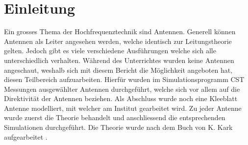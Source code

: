 \section{Einleitung}

Ein grosses Thema der Hochfrequenztechnik sind Antennen. Generell können Antennen als Leiter angesehen werden, welche identisch zur Leitungstheorie gelten. Jedoch gibt es viele verschiedene Ausführungen welche sich alle unterschiedlich verhalten. Während des Unterrichtes wurden keine Antennen angeschaut, weshalb sich mit diesem Bericht die Möglichkeit angeboten hat, diesen Teilbereich aufzuarbeiten. Hierfür wurden im Simulationsprogramm CST Messungen ausgewählter Antennen durchgeführt, welche sich vor allem auf die Direktivität der Antennen beziehen. Als Abschluss wurde noch eine Kleeblatt Antenne modelliert, mit welcher am Institut gearbeitet wird. Zu jeder Antenne wurde zuerst die Theorie behandelt und anschliessend die entsprechenden Simulationen durchgeführt. Die Theorie wurde nach dem Buch von K. Kark aufgearbeitet \cite{book}.